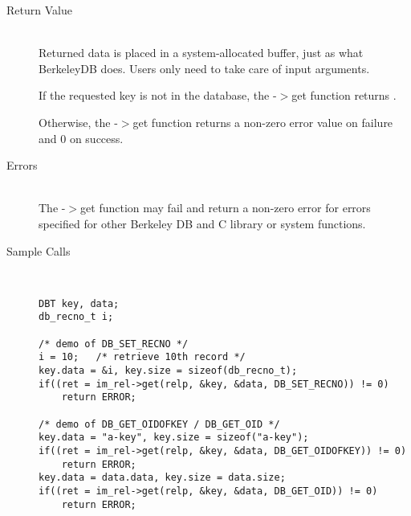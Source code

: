 \begin{description}
\item[Return Value]\ \\
  Returned data is placed in a system-allocated buffer, just as what
  BerkeleyDB does.  Users only need to take care of input arguments.

  If the requested key is not in the database, the {\IMREL}-$>$get
  function returns {\DBNOTFOUND}.

  Otherwise, the {\IMREL}-$>$get function returns a non-zero error
  value on failure and 0 on success. 

\item[Errors]\ \\
  The {\IMREL}-$>$get function may fail and return a non-zero error
  for errors specified for other Berkeley DB and C library or system
  functions.

\item[Sample Calls]\ 
\begin{verbatim}
DBT key, data;
db_recno_t i;

/* demo of DB_SET_RECNO */
i = 10;   /* retrieve 10th record */
key.data = &i, key.size = sizeof(db_recno_t);
if((ret = im_rel->get(relp, &key, &data, DB_SET_RECNO)) != 0)
    return ERROR;

/* demo of DB_GET_OIDOFKEY / DB_GET_OID */
key.data = "a-key", key.size = sizeof("a-key");
if((ret = im_rel->get(relp, &key, &data, DB_GET_OIDOFKEY)) != 0)
    return ERROR;
key.data = data.data, key.size = data.size;
if((ret = im_rel->get(relp, &key, &data, DB_GET_OID)) != 0)
    return ERROR;
\end{verbatim}
\end{description}

\newpage
